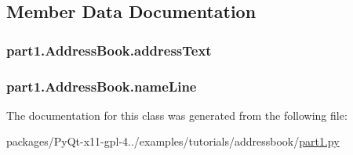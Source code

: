 \subsection{Member Data Documentation}
\hypertarget{classpart1_1_1AddressBook_a2a0fcafb9560e565cb298fa67e888f19}{}
\subsubsection[{address\+Text}]{\setlength{\rightskip}{0pt plus 5cm}part1.\+Address\+Book.\+address\+Text}\label{classpart1_1_1AddressBook_a2a0fcafb9560e565cb298fa67e888f19}
\hypertarget{classpart1_1_1AddressBook_a32daddfa3ace97696337e060f57ff567}{}
\subsubsection[{name\+Line}]{\setlength{\rightskip}{0pt plus 5cm}part1.\+Address\+Book.\+name\+Line}\label{classpart1_1_1AddressBook_a32daddfa3ace97696337e060f57ff567}


The documentation for this class was generated from the following file\+:\begin{DoxyCompactItemize}
\item 
packages/\+Py\+Qt-\/x11-\/gpl-\/4../examples/tutorials/addressbook/\hyperlink{part1_8py}{part1.\+py}\end{DoxyCompactItemize}
